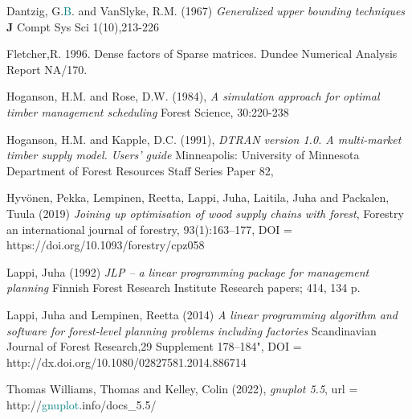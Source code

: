 \begin{thebibliography}{9} 
 
Dantzig, G.\textcolor{teal}{B}. and VanSlyke, R.M.  (1967) 
\emph{Generalized upper bounding techniques} 
\textbf{J} Compt Sys Sci 1(10),213-226 
 
Fletcher,R.  1996. Dense factors of Sparse matrices. Dundee 
Numerical Analysis Report NA/170. 
 
 
Hoganson, H.M. and Rose, D.W.  (1984), 
\emph{A simulation approach for optimal timber management scheduling} 
Forest Science, 30:220-238 
 
Hoganson, H.M. and Kapple,  D.C. (1991), 
\emph{DTRAN version 1.0. A multi-market timber supply model. Users’ guide} 
Minneapolis: University of Minnesota Department of Forest 
Resources Staff Series Paper 82, 
 
Hyv\"onen, Pekka, Lempinen, Reetta, 
Lappi, Juha, Laitila, Juha  and Packalen, Tuula (2019) 
\emph{Joining up optimisation of wood supply chains with forest}, 
Forestry an international journal of forestry, 
93(1):163--177, 
DOI = https://doi.org/10.1093/forestry/cpz058 
 
 Lappi, Juha (1992) \emph{JLP -- a linear programming package for 
management planning} Finnish Forest Research Institute 
Research papers; 414, 134 p. 
 
 
 
Lappi, Juha and Lempinen, Reetta (2014) 
\emph{A linear programming algorithm and software 
for forest-level planning problems 
including factories} 
Scandinavian Journal of Forest Research,29 Supplement 178--184", 
DOI =  http://dx.doi.org/10.1080/02827581.2014.886714 
 
Thomas Williams, Thomas and Kelley, Colin (2022), 
\emph{gnuplot 5.5}, 
url = http://\textcolor{teal}{gnuplot}.info/docs\_5.5/ 
 
 
 
 
 
 
\end{thebibliography} 
